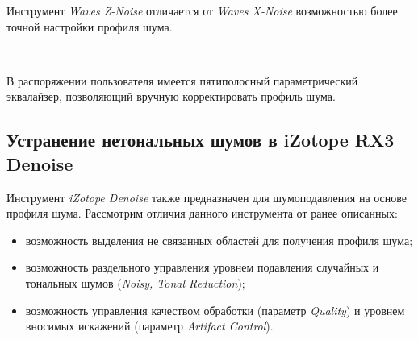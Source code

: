 \documentclass{beamer}
\begin{document}
\begin{frame}
Инструмент \emph{Waves Z-Noise} отличается от \emph{Waves X-Noise} возможностью более точной настройки профиля шума. 

~

В распоряжении пользователя имеется пятиполосный параметрический эквалайзер, позволяющий вручную корректировать профиль шума.

\end{frame}

\subsection{Устранение нетональных шумов в iZotope RX3 Denoise}
\begin{frame}
Инструмент \emph{iZotope Denoise} также предназначен для шумоподавления на основе профиля шума. Рассмотрим отличия данного инструмента от ранее описанных:
\begin{itemize}
  \item возможность выделения не связанных областей для получения профиля шума;
  \item возможность раздельного управления уровнем подавления случайных и тональных шумов (\emph{Noisy, Tonal Reduction});
  \item возможность управления качеством обработки (параметр \emph{Quality}) и уровнем вносимых искажений (параметр \emph{Artifact Control}).
\end{itemize}

\end{frame}
\end{document}
